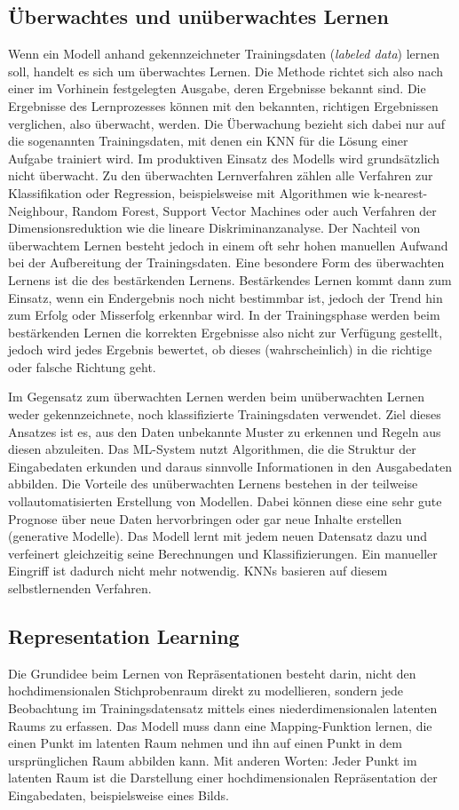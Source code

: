 \subsection{Überwachtes und unüberwachtes Lernen}\label{überwachtes / unüberwachtes Lernen}
Wenn ein Modell anhand gekennzeichneter Trainingsdaten (\emph{labeled data}) lernen soll, handelt es sich um überwachtes Lernen. Die Methode richtet sich also nach einer im Vorhinein festgelegten Ausgabe, deren Ergebnisse bekannt sind. Die Ergebnisse des Lernprozesses können mit den bekannten, richtigen Ergebnissen verglichen, also überwacht, werden. Die Überwachung bezieht sich dabei nur auf die sogenannten Trainingsdaten, mit denen ein KNN für die Lösung einer Aufgabe trainiert wird. Im produktiven Einsatz des Modells wird grundsätzlich nicht überwacht.
Zu den überwachten Lernverfahren zählen alle Verfahren zur Klassifikation oder Regression, beispielsweise mit Algorithmen wie k-nearest-Neighbour, Random Forest, Support Vector Machines oder auch Verfahren der Dimensionsreduktion wie die lineare Diskriminanzanalyse. Der Nachteil von überwachtem Lernen besteht jedoch in einem oft sehr hohen manuellen Aufwand bei der Aufbereitung der Trainingsdaten.
Eine besondere Form des überwachten Lernens ist die des bestärkenden Lernens. Bestärkendes Lernen kommt dann zum Einsatz, wenn ein Endergebnis noch nicht bestimmbar ist, jedoch der Trend hin zum Erfolg oder Misserfolg erkennbar wird. In der Trainingsphase werden beim bestärkenden Lernen die korrekten Ergebnisse also nicht zur Verfügung gestellt, jedoch wird jedes Ergebnis bewertet, ob dieses (wahrscheinlich) in die richtige oder falsche Richtung geht.\cite{ras18}

Im Gegensatz zum überwachten Lernen werden beim unüberwachten Lernen weder gekennzeichnete, noch klassifizierte Trainingsdaten verwendet. Ziel dieses Ansatzes ist es, aus den Daten unbekannte Muster zu erkennen und Regeln aus diesen abzuleiten. Das ML-System nutzt Algorithmen, die die Struktur der Eingabedaten erkunden und daraus sinnvolle Informationen in den Ausgabedaten abbilden. Die Vorteile des unüberwachten Lernens bestehen in der teilweise vollautomatisierten Erstellung von Modellen. Dabei können diese eine sehr gute Prognose über neue Daten hervorbringen oder gar neue Inhalte erstellen (generative Modelle). Das Modell lernt mit jedem neuen Datensatz dazu und verfeinert gleichzeitig seine Berechnungen und Klassifizierungen. Ein manueller Eingriff ist dadurch nicht mehr notwendig. KNNs basieren auf diesem selbstlernenden Verfahren.

\subsection{Representation Learning}\label{Representation Learning}
Die Grundidee beim Lernen von Repräsentationen besteht darin, nicht den hochdimensionalen Stichprobenraum direkt zu modellieren, sondern jede Beobachtung im Trainingsdatensatz mittels eines niederdimensionalen latenten Raums zu erfassen. Das Modell muss dann eine Mapping-Funktion lernen, die einen Punkt im latenten Raum nehmen und ihn auf einen Punkt in dem ursprünglichen Raum abbilden kann. Mit anderen Worten: Jeder Punkt im latenten Raum ist die Darstellung einer hochdimensionalen Repräsentation der Eingabedaten, beispielsweise eines Bilds.